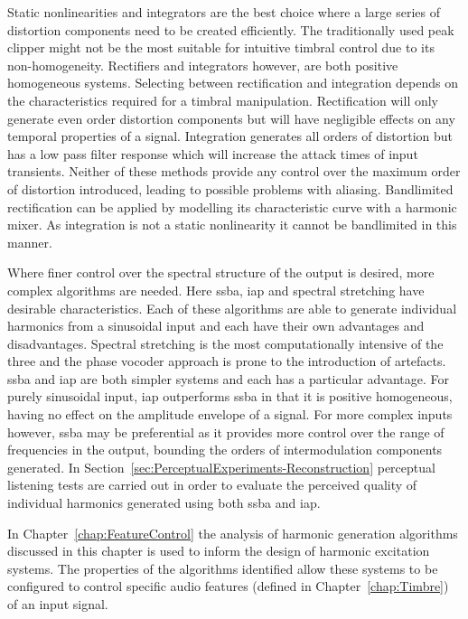 	Static nonlinearities and integrators are the best choice where a large series of distortion components need to be
	created efficiently. The traditionally used peak clipper might not be the most suitable for intuitive timbral
	control due to its non-homogeneity. Rectifiers and integrators however, are both positive homogeneous systems.
	Selecting between rectification and integration depends on the characteristics required for a timbral manipulation.
	Rectification will only generate even order distortion components but will have negligible effects on any temporal
	properties of a signal. Integration generates all orders of distortion but has a low pass filter response which
	will increase the attack times of input transients. Neither of these methods provide any control over the maximum
	order of distortion introduced, leading to possible problems with aliasing. Bandlimited rectification can be
	applied by modelling its characteristic curve with a harmonic mixer. As integration is not a static nonlinearity it
	cannot be bandlimited in this manner.

	Where finer control over the spectral structure of the output is desired, more complex algorithms are needed. Here
	\acrshort{ssba}, \acrshort{iap} and spectral stretching have desirable characteristics. Each of these algorithms
	are able to generate individual harmonics from a sinusoidal input and each have their own advantages and
	disadvantages. Spectral stretching is the most computationally intensive of the three and the phase vocoder
	approach is prone to the introduction of artefacts. \acrshort{ssba} and \acrshort{iap} are both simpler systems and
	each has a particular advantage. For purely sinusoidal input, \acrshort{iap} outperforms \acrshort{ssba} in that it
	is positive homogeneous, having no effect on the amplitude envelope of a signal. For more complex inputs however,
	\acrshort{ssba} may be preferential as it provides more control over the range of frequencies in the output,
	bounding the orders of intermodulation components generated. In
	Section~\ref{sec:PerceptualExperiments-Reconstruction} perceptual listening tests are carried out in order to
	evaluate the perceived quality of individual harmonics generated using both \acrshort{ssba} and \acrshort{iap}.

	In Chapter~\ref{chap:FeatureControl} the analysis of harmonic generation algorithms discussed in this chapter is
	used to inform the design of harmonic excitation systems. The properties of the algorithms identified allow these
	systems to be configured to control specific audio features (defined in Chapter~\ref{chap:Timbre}) of an input
	signal.
